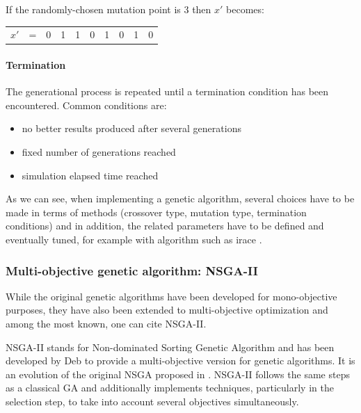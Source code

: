 \noindent
If the randomly-chosen mutation point is 3 then $x'$ becomes:
\begin{table}[h!]
\begin{center}
\begin{tabular}{cccc|c|ccccc}
\cline{5-5}
$x'$ & = & 0 & 1 & 1 & 0 & 1 & 0 & 1 & 0\\
\cline{5-5}
\end{tabular}
\end{center}
\end{table}

\paragraph{Termination}
The generational process is repeated until a termination condition has been encountered. Common conditions are:
\begin{itemize}
\item no better results produced after several generations
\item fixed number of generations reached
\item simulation elapsed time reached
\end{itemize}

As we can see, when implementing a genetic algorithm, several choices have to be made in terms of methods (crossover type, mutation type, termination conditions) and in addition, the related parameters have to be defined and eventually tuned, for example with algorithm such as irace \cite{LopDubStu2011irace}.

\subsubsection{Multi-objective genetic algorithm: NSGA-II}
While the original genetic algorithms have been developed for mono-objective purposes, they have also been extended to multi-objective optimization and among the most known, one can cite NSGA-II.

NSGA-II stands for Non-dominated Sorting Genetic Algorithm and has been developed by Deb \cite{Deb00afast} to provide a multi-objective version for genetic algorithms. It is an evolution of the original NSGA proposed in \cite{Srinivas94multiobjectiveoptimization}. NSGA-II follows the same steps as a classical GA and additionally implements techniques, particularly in the selection step, to take into account several objectives simultaneously.

